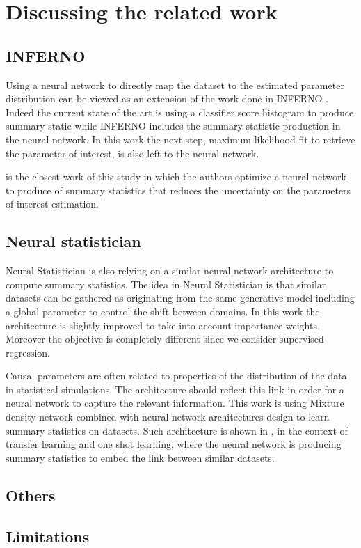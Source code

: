 \section{Discussing the related work} %
\label{sec:discussing_the_related_work}



\subsection{INFERNO} %
\label{sub:inferno}

Using a neural network to directly map the dataset to the estimated parameter distribution can be viewed as an extension of the work done in INFERNO \cite{DECASTRO2019170inferno}. 
Indeed the current state of the art is using a classifier score histogram to produce summary static while INFERNO includes the summary statistic production in the neural network.
In this work the next step, maximum likelihood fit to retrieve the parameter of interest, is also left to the neural network.


\cite{DECASTRO2019170inferno} is the closest work of this study in which the authors optimize a neural network to produce of summary statistics that reduces the uncertainty on the parameters of interest estimation.



\subsection{Neural statistician} %
\label{sub:neural_statistician}

Neural Statistician \cite{Edwards17neuralstatistician} is also relying on a similar neural network architecture to compute summary statistics.
The idea in Neural Statistician is that similar datasets can be gathered as originating from the same generative model including a global parameter to control the shift between domains.
In this work the architecture is slightly improved to take into account importance weights.
Moreover the objective is completely different since we consider supervised regression.

Causal parameters are often related to properties of the distribution of the data in statistical simulations.
The architecture should reflect this link in order for a neural network to capture the relevant information.
This work is using Mixture density network \cite{Bishop94mixturedensity} combined with neural network architectures design to learn summary statistics on datasets.
Such architecture is shown in \cite{Edwards17neuralstatistician}, in the context of transfer learning and one shot learning, where the neural network is producing summary statistics to embed the link between similar datasets.



\subsection{Others} %
\label{sub:others}



\subsection{Limitations} %
\label{sub:limitations2}



